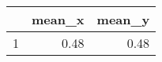 \begin{table}[ht]
\centering
\begin{tabular}{rrr}
  \hline
 & mean\_x & mean\_y \\ 
  \hline
1 & 0.48 & 0.48 \\ 
   \hline
\end{tabular}
\end{table}
